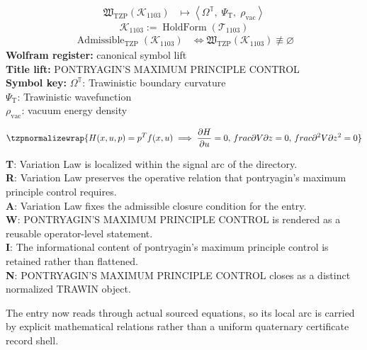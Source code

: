 \noindent
\begin{minipage}[t]{0.48\linewidth}
\begingroup
\small
\[
\begin{aligned}
\mathfrak{W}_{\mathrm{TZP}}\!\left(\mathcal{K}_{1103}\right)
&\longmapsto
\left\langle \Omega^{\mathbb{T}},\; \Psi_{\mathrm{T}},\; \rho_{\mathrm{vac}} \right\rangle
\end{aligned}
\]
\[
\mathcal{K}_{1103}
:=
\operatorname{HoldForm}\!\left(\mathcal{T}_{1103}\right)
\]
\[
\begin{aligned}
\operatorname{Admissible}_{\mathrm{TZP}}\!\left(\mathcal{K}_{1103}\right)
&\Longleftrightarrow
\mathfrak{W}_{\mathrm{TZP}}\!\left(\mathcal{K}_{1103}\right)\not\equiv\varnothing
\end{aligned}
\]
\textbf{Wolfram register:} canonical symbol lift\\
\textbf{Title lift:} PONTRYAGIN'S MAXIMUM PRINCIPLE CONTROL\\
\textbf{Symbol key:} \(\Omega^{\mathbb{T}}\): Trawinistic boundary curvature\\ \(\Psi_{\mathrm{T}}\): Trawinistic wavefunction\\ \(\rho_{\mathrm{vac}}\): vacuum energy density
\par
\endgroup
\end{minipage}\hfill
\begin{minipage}[t]{0.48\linewidth}
\[
\tzpnormalizewrap{H(x,u,p) = p^T f(x,u) \implies \frac{\partial H}{\partial u} = 0,\,frac{\partial V}{\partial z} = 0,\,frac{\partial^{2} V}{\partial z^{2}} = 0}
\]

\small
\textbf{T}: Variation Law is localized within the signal arc of the directory.\\
\textbf{R}: Variation Law preserves the operative relation that pontryagin's maximum principle control requires.\\
\textbf{A}: Variation Law fixes the admissible closure condition for the entry.\\
\textbf{W}: PONTRYAGIN'S MAXIMUM PRINCIPLE CONTROL is rendered as a reusable operator-level statement.\\
\textbf{I}: The informational content of pontryagin's maximum principle control is retained rather than flattened.\\
\textbf{N}: PONTRYAGIN'S MAXIMUM PRINCIPLE CONTROL closes as a distinct normalized TRAWIN object.
\normalsize
\end{minipage}

The entry now reads through actual sourced equations, so its local arc is carried by explicit mathematical relations rather than a uniform quaternary certificate record shell.
\clearpage

